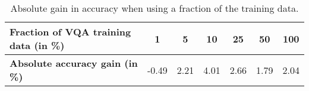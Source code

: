 \documentclass{article}
\begin{document}
\begin{table}[H]
\vspace{-1mm}
\begin{minipage}{0.4\linewidth}
\caption{\small Absolute gain in accuracy when using a fraction of the training data.}
\label{tbl:vqa_data}

\end{minipage}
\begin{minipage}{0.6\linewidth}
\tabcolsep=0.1cm
\begin{center}
\begin{scriptsize}
\begin{tabular}{lcccccc}
\toprule
\textbf{Fraction of VQA training data (in \%)} & 1 & 5 & 10 & 25 & 50  & 100  \\
\midrule
\textbf{Absolute accuracy gain (in \%)} &  -0.49 & 2.21 &  4.01 &  2.66 &  1.79 &  2.04   \\
\bottomrule
\end{tabular}
\end{scriptsize}
\end{center}
\end{minipage}
\vspace{-6mm}

\end{table}
\end{document}
